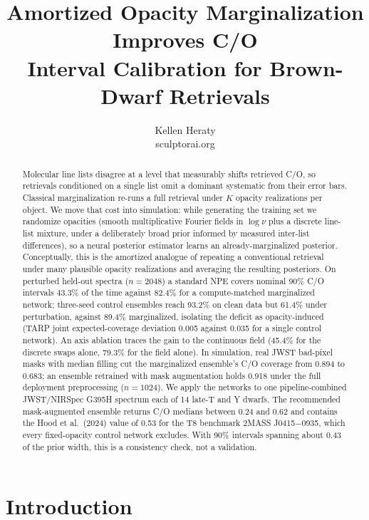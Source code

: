 \documentclass{article}
\title{Amortized Opacity Marginalization Improves C/O\\
Interval Calibration for Brown-Dwarf Retrievals}
\author{%
  Kellen Heraty \\
  sculptorai.org \\
}
\begin{document}
\maketitle

\begin{abstract}
Molecular line lists disagree at a level that measurably shifts retrieved C/O,
so retrievals conditioned on a single list omit a dominant systematic from their
error bars. Classical marginalization re-runs a full retrieval under $K$ opacity
realizations per object. We move that cost into simulation: while generating the
training set we randomize opacities (smooth multiplicative Fourier fields in
$\log\nu$ plus a discrete line-list mixture, under a deliberately broad prior
informed by measured inter-list differences), so a neural posterior estimator
learns an already-marginalized posterior. Conceptually, this is the amortized
analogue of repeating a conventional retrieval under many plausible opacity
realizations and averaging the resulting posteriors. On perturbed held-out spectra
($n=2048$) a standard NPE covers nominal 90\% C/O intervals 43.3\% of the time
against 82.4\% for a compute-matched marginalized network; three-seed control
ensembles reach 93.2\%
on clean data but 61.4\% under perturbation, against 89.4\% marginalized,
isolating the deficit as opacity-induced (TARP joint expected-coverage deviation
0.005 against 0.035 for a single control network). An axis ablation traces the gain to the continuous field
(45.4\% for the discrete swaps alone, 79.3\% for the field alone). In simulation, real
JWST bad-pixel masks with median filling cut the marginalized ensemble's C/O
coverage from 0.894 to 0.683; an ensemble retrained with mask augmentation holds
0.918 under the full deployment preprocessing ($n=1024$). We apply
the networks to one pipeline-combined JWST/NIRSpec G395H spectrum each of 14
late-T and Y dwarfs. The recommended mask-augmented ensemble returns C/O medians between
0.24 and 0.62 and contains the Hood et al.\ (2024) value of 0.53 for the T8
benchmark 2MASS J0415$-$0935, which every fixed-opacity control network excludes.
With 90\% intervals spanning about 0.43 of the prior width, this is a
consistency check, not a validation.
\end{abstract}

\section{Introduction}
\label{sec:intro}
\end{document}
